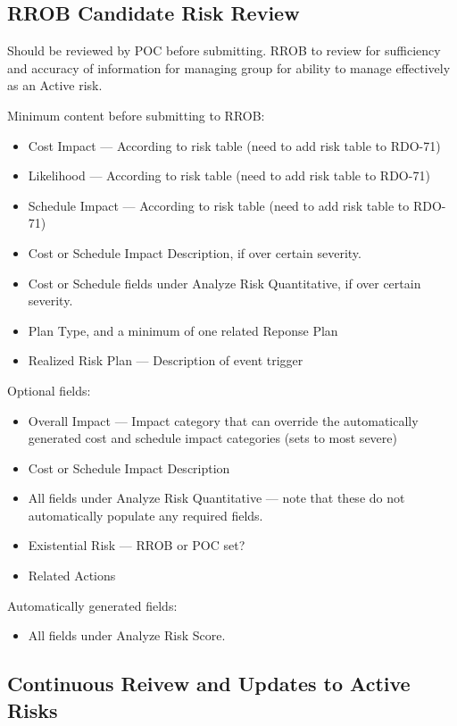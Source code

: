 \subsection{RROB Candidate Risk Review}

Should be reviewed by POC before submitting.
RROB to review for sufficiency and accuracy of information for managing group for ability to manage effectively as an Active risk.

Minimum content before submitting to RROB:
\begin{itemize}
	\item Cost Impact --- According to risk table (need to add risk table to RDO-71)
	\item Likelihood --- According to risk table (need to add risk table to RDO-71)
	\item Schedule Impact --- According to risk table (need to add risk table to RDO-71)
	\item Cost or Schedule Impact Description, if over certain severity.
	\item Cost or Schedule fields under Analyze Risk Quantitative, if over certain severity.
	\item Plan Type, and a minimum of one related Reponse Plan
	\item Realized Risk Plan --- Description of event trigger
\end{itemize}

Optional fields:
\begin{itemize}
	\item Overall Impact --- Impact category that can override the automatically generated cost and schedule impact categories (sets to most severe)
	\item Cost or Schedule Impact Description
	\item All fields under Analyze Risk Quantitative --- note that these do not automatically populate any required fields.
	\item Existential Risk --- RROB or POC set?
	\item Related Actions
\end{itemize}

Automatically generated fields:
\begin{itemize}
	\item All fields under Analyze Risk Score.
\end{itemize}

\subsection{Continuous Reivew and Updates to Active Risks}

